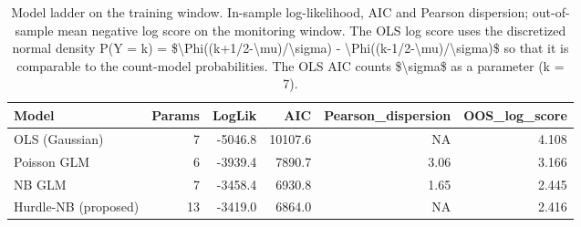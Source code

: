 \begin{table}

\caption{Model ladder on the training window. In-sample log-likelihood, AIC and Pearson dispersion; out-of-sample mean negative log score on the monitoring window. The OLS log score uses the discretized normal density P(Y = k) = \$\textbackslash{}Phi((k+1/2-\textbackslash{}mu)/\textbackslash{}sigma) - \textbackslash{}Phi((k-1/2-\textbackslash{}mu)/\textbackslash{}sigma)\$ so that it is comparable to the count-model probabilities. The OLS AIC counts \$\textbackslash{}sigma\$ as a parameter (k = 7).}
\centering
\begin{tabular}[t]{lrrrrr}
\toprule
Model & Params & LogLik & AIC & Pearson\_dispersion & OOS\_log\_score\\
\midrule
OLS (Gaussian) & 7 & -5046.8 & 10107.6 & NA & 4.108\\
Poisson GLM & 6 & -3939.4 & 7890.7 & 3.06 & 3.166\\
NB GLM & 7 & -3458.4 & 6930.8 & 1.65 & 2.445\\
Hurdle-NB (proposed) & 13 & -3419.0 & 6864.0 & NA & 2.416\\
\bottomrule
\end{tabular}
\end{table}
